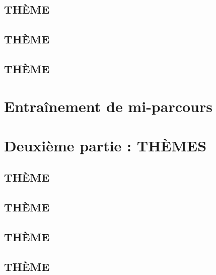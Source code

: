 \documentclass[poly,trombi]{valbonne}
\begin{document}

\subsection{THÈME}


\subsection{THÈME}


\subsection{THÈME}






\section{Entraînement de mi-parcours}






\section{Deuxième partie : THÈMES}

\subsection{THÈME}


\subsection{THÈME}


\subsection{THÈME}


\subsection{THÈME}
\end{document}
